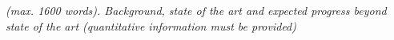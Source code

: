 % 
%
%
%

\emph{(max. 1600 words). Background, state of the art and expected progress beyond state of the art (quantitative information must be provided)}


% 
